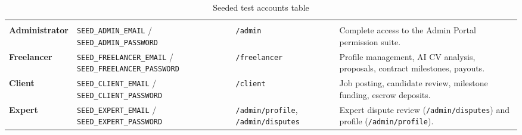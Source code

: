 \renewcommand{\arraystretch}{1.45}
\setlength{\tabcolsep}{5pt}
\begin{longtable}{|L{2.6cm}|L{5.2cm}|L{2.5cm}|L{4.2cm}|}
\caption{Seeded test accounts table}\label{tab:seeded_accounts} \\
\hline
{} &  &  &  \\ \hline
\endfirsthead
\hline
{} &  &  &  \\ \hline
\endhead
\textbf{Administrator} & \texttt{SEED\_\allowbreak{}ADMIN\_\allowbreak{}EMAIL} / \texttt{SEED\_\allowbreak{}ADMIN\_\allowbreak{}PASSWORD} & \texttt{/\allowbreak admin} & Complete access to the Admin Portal permission suite. \\ \hline
\textbf{Freelancer} & \texttt{SEED\_\allowbreak{}FREELANCER\_\allowbreak{}EMAIL} / \texttt{SEED\_\allowbreak{}FREELANCER\_\allowbreak{}PASSWORD} & \texttt{/\allowbreak freelancer} & Profile management, AI CV analysis, proposals, contract milestones, payouts. \\ \hline
\textbf{Client} & \texttt{SEED\_\allowbreak{}CLIENT\_\allowbreak{}EMAIL} / \texttt{SEED\_\allowbreak{}CLIENT\_\allowbreak{}PASSWORD} & \texttt{/\allowbreak client} & Job posting, candidate review, milestone funding, escrow deposits. \\ \hline
\textbf{Expert} & \texttt{SEED\_\allowbreak{}EXPERT\_\allowbreak{}EMAIL} / \texttt{SEED\_\allowbreak{}EXPERT\_\allowbreak{}PASSWORD} & \texttt{/\allowbreak admin/\allowbreak profile}, \texttt{/\allowbreak admin/\allowbreak disputes} & Expert dispute review (\texttt{/\allowbreak admin/\allowbreak disputes}) and profile (\texttt{/\allowbreak admin/\allowbreak profile}). \\ \hline
\end{longtable}
